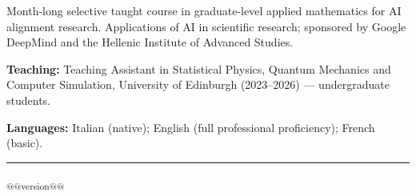 \documentclass[10pt,a4paper]{article}
\begin{document}
\begin{cvlist}
\end{cvlist}

\begin{cvlist}
   Month-long selective taught course in graduate-level applied mathematics for AI alignment research.
   Applications of AI in scientific research; sponsored by Google DeepMind and the Hellenic
   Institute of Advanced Studies.
\end{cvlist}

\begin{cvlist}
  \item[] \textbf{Teaching:} Teaching Assistant in Statistical Physics, Quantum Mechanics and Computer
    Simulation, University of Edinburgh (2023--2026) — undergraduate students.
  \item[] \textbf{Languages:} Italian (native); English (full professional
  proficiency); French (basic).
\end{cvlist}

\vfill\hrule
\begin{description}\item
            {{\textsubscript{@@version@@}}}
\end{description}
\end{document}
